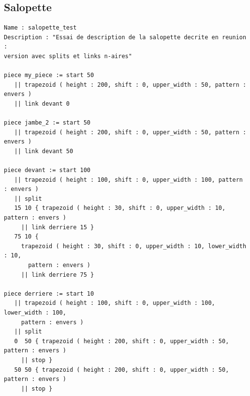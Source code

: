 \documentclass[a4paper,10pt]{article}
\begin{document}
\subsection{Salopette}

%

\begin{lstlisting}
Name : salopette_test
Description : "Essai de description de la salopette decrite en reunion : 
version avec splits et links n-aires"

piece my_piece := start 50
   || trapezoid ( height : 200, shift : 0, upper_width : 50, pattern : envers )
   || link devant 0

piece jambe_2 := start 50
   || trapezoid ( height : 200, shift : 0, upper_width : 50, pattern : envers )
   || link devant 50

piece devant := start 100
   || trapezoid ( height : 100, shift : 0, upper_width : 100, pattern : envers )
   || split
   15 10 { trapezoid ( height : 30, shift : 0, upper_width : 10, pattern : envers )
     || link derriere 15 }
   75 10 { 
     trapezoid ( height : 30, shift : 0, upper_width : 10, lower_width : 10, 
       pattern : envers )
     || link derriere 75 }

piece derriere := start 10
   || trapezoid ( height : 100, shift : 0, upper_width : 100, lower_width : 100, 
     pattern : envers )
   || split
   0  50 { trapezoid ( height : 200, shift : 0, upper_width : 50, pattern : envers )
     || stop }
   50 50 { trapezoid ( height : 200, shift : 0, upper_width : 50, pattern : envers )
     || stop }
\end{lstlisting}
\end{document}
